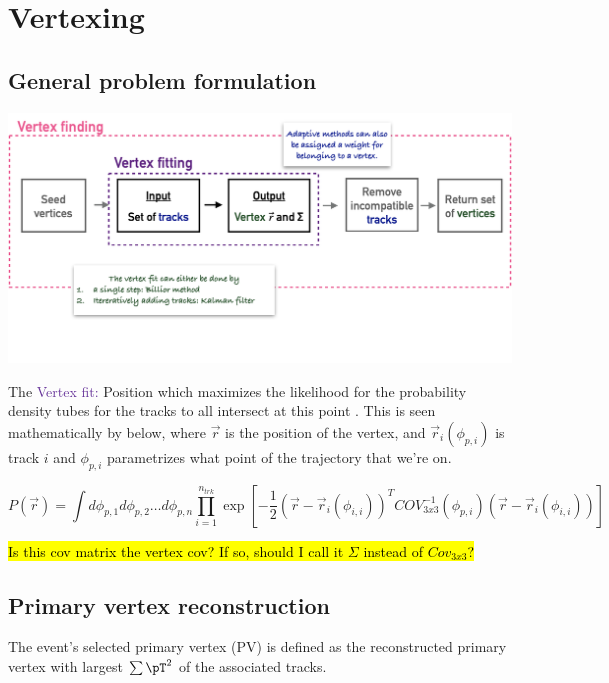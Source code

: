 \section{Vertexing}
\label{sec:vertexing}

\subsection{General problem formulation}

\includegraphics[width=\textwidth]{figures/cp-graphics/Vertex-finding-fitting}

The \textcolor{rebeccapurple}{Vertex fit:} Position which maximizes the likelihood for the probability density tubes for the tracks to all intersect at this point \cite{giacinto-thesis}. 
This is seen mathematically by \Eq{\ref{eq:vtx-prob-density-fct}} below, where $\vec{r}$ is the position of the vertex, and $\vec{r}_i(\phi_{p,i})$ is track $i$ and $\phi_{p,i}$ parametrizes what point of the trajectory that we're on.

\begin{equation}
P(\vec{r}) = \int d \phi_{p,1} d \phi_{p,2} \ldots d \phi_{p,n} \prod_{i=1}^{n_{trk}} 
\exp \left[ - \frac{1}{2}  \left(\vec{r} - \vec{r}_i (\phi_{i,i})\right)^T COV^{-1}_{3x3} (\phi_{p,i}) \left(\vec{r} - \vec{r}_i (\phi_{i,i})\right) \right]
\label{eq:vtx-prob-density-fct}
\end{equation}

\hl{Is this cov matrix the vertex cov? If so, should I call it $\Sigma$ instead of $Cov_{3x3}$?}

\subsection{Primary vertex reconstruction}

The event's selected primary vertex (PV) is defined as the reconstructed primary vertex with largest $\sum \pT^2$ of the associated tracks. 
